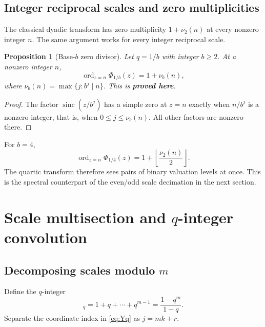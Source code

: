 \documentclass[11pt,oneside]{article}
\numberwithin{equation}{section}
\newtheorem{proposition}[theorem]{Proposition}
\theoremstyle{definition}
\theoremstyle{remark}
\newcommand{\sinc}{\operatorname{sinc}}
\newcommand{\ord}{\operatorname{ord}}
\newcommand{\proved}{\textcolor{deepgreen}{\textbf{proved here}}}
\newcommand{\floor}[1]{\left\lfloor#1\right\rfloor}
\begin{document}
\subsection{Integer reciprocal scales and zero multiplicities}

The classical dyadic transform has zero multiplicity $1+\nu_2(n)$ at every
nonzero integer $n$.  The same argument works for every integer reciprocal
scale.

\begin{proposition}[Base-$b$ zero divisor]
\label{prop:base-b-zero}
Let $q=1/b$ with integer $b\ge2$.  At a nonzero integer $n$,
\begin{equation}
 \ord_{z=n}\Phi_{1/b}(z)=1+\nu_b(n),
 \label{eq:base-b-zero-order}
\end{equation}
where $\nu_b(n)=\max\{j:b^j\mid n\}$.  This is \proved.
\end{proposition}

\begin{proof}
The factor $\sinc(z/b^j)$ has a simple zero at $z=n$ exactly when
$n/b^j$ is a nonzero integer, that is, when $0\le j\le\nu_b(n)$.  All other
factors are nonzero there.
\end{proof}

For $b=4$,
\begin{equation}
 \ord_{z=n}\Phi_{1/4}(z)
 =1+\floor{\frac{\nu_2(n)}2}.
 \label{eq:quartic-zero-order}
\end{equation}
The quartic transform therefore sees pairs of binary valuation levels at once.
This is the spectral counterpart of the even/odd scale decimation in the next
section.

\section[Scale multisection and q-integer convolution]{Scale multisection and $q$-integer convolution}
\label{sec:multisection}

\subsection[Decomposing scales modulo m]{Decomposing scales modulo $m$}

Define the $q$-integer
\begin{equation}
 [m]_q=1+q+\cdots+q^{m-1}=\frac{1-q^m}{1-q}.
 \label{eq:q-integer}
\end{equation}
Separate the coordinate index in \eqref{eq:Yq} as $j=mk+r$.
\end{document}
